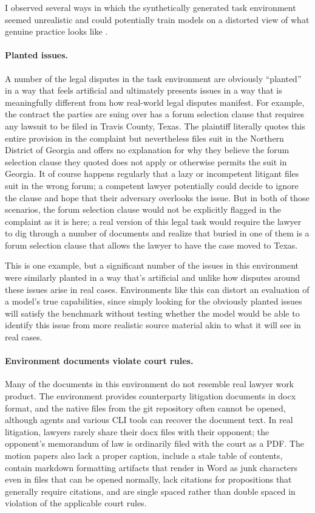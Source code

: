 \documentclass[11pt]{article}
\begin{document}
I observed several ways in which the synthetically generated task environment seemed unrealistic and could potentially train models on a distorted view of what genuine practice looks like \citep{labtask}.

\paragraph{Planted issues.} A number of the legal disputes in the task environment are obviously ``planted'' in a way that feels artificial and ultimately presents issues in a way that is meaningfully different from how real-world legal disputes manifest. For example, the contract the parties are suing over has a forum selection clause that requires any lawsuit to be filed in Travis County, Texas. The plaintiff literally quotes this entire provision in the complaint but nevertheless files suit in the Northern District of Georgia and offers no explanation for why they believe the forum selection clause they quoted does not apply or otherwise permits the suit in Georgia. It of course happens regularly that a lazy or incompetent litigant files suit in the wrong forum; a competent lawyer potentially could decide to ignore the clause and hope that their adversary overlooks the issue. But in both of those scenarios, the forum selection clause would not be explicitly flagged in the complaint as it is here; a real version of this legal task would require the lawyer to dig through a number of documents and realize that buried in one of them is a forum selection clause that allows the lawyer to have the case moved to Texas.

This is one example, but a significant number of the issues in this environment were similarly planted in a way that's artificial and unlike how disputes around these issues arise in real cases. Environments like this can distort an evaluation of a model's true capabilities, since simply looking for the obviously planted issues will satisfy the benchmark without testing whether the model would be able to identify this issue from more realistic source material akin to what it will see in real cases.

\paragraph{Environment documents violate court rules.} Many of the documents in this environment do not resemble real lawyer work product. The environment provides counterparty litigation documents in docx format, and the native files from the git repository often cannot be opened, although agents and various CLI tools can recover the document text. In real litigation, lawyers rarely share their docx files with their opponent; the opponent's memorandum of law is ordinarily filed with the court as a PDF. The motion papers also lack a proper caption, include a stale table of contents, contain markdown formatting artifacts that render in Word as junk characters even in files that can be opened normally, lack citations for propositions that generally require citations, and are single spaced rather than double spaced in violation of the applicable court rules.
\end{document}
